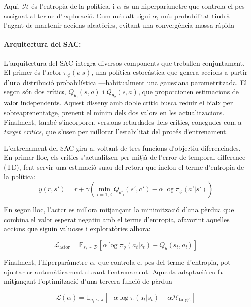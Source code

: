 \documentclass[12pt,a4paper,twoside]{book}
\begin{document}
Aquí, $\mathcal{H}$ és l'entropia de la política, i $\alpha$ és un hiperparàmetre que controla el pes assignat al terme d'exploració. Com més alt sigui $\alpha$, més probabilitat tindrà l'agent de mantenir accions aleatòries, evitant una convergència massa ràpida.

\paragraph{Arquitectura del SAC:}

L'arquitectura del SAC integra diversos components que treballen conjuntament. El primer és l'actor $\pi_\phi(a|s)$, una política estocàstica que genera accions a partir d'una distribució probabilística —habitualment una gaussiana parametritzada. El segon són dos crítics, $Q_{\theta_1}(s,a)$ i $Q_{\theta_2}(s,a)$, que proporcionen estimacions de valor independents. Aquest disseny amb doble crític busca reduir el biaix per sobreaprenentatge, prenent el mínim dels dos valors en les actualitzacions. Finalment, també s'incorporen versions retardades dels crítics, conegudes com a \textit{target critics}, que s'usen per millorar l'estabilitat del procés d'entrenament.


L'entrenament del SAC gira al voltant de tres funcions d'objectiu diferenciades. En primer lloc, els crítics s'actualitzen per mitjà de l'error de temporal difference (TD), fent servir una estimació suau del retorn que inclou el terme d'entropia de la política:
  \begin{equation}
  y(r,s') = r + \gamma \left( \min_{i=1,2} Q_{\theta'_i}(s', a') - \alpha \log \pi_\phi(a'|s') \right)
  \end{equation}

  En segon lloc, l'actor es millora mitjançant la minimització d'una pèrdua que combina el valor esperat negatiu amb el terme d'entropia, afavorint aquelles accions que siguin valuoses i exploratòries alhora:

  \begin{equation}
  \mathcal{L}_{\text{actor}} = \mathbb{E}_{s_t \sim \mathcal{D}} \left[ \alpha \log \pi_\phi(a_t|s_t) - Q_{\theta}(s_t, a_t) \right]
  \end{equation}

  Finalment, l'hiperparàmetre $\alpha$, que controla el pes del terme d'entropia, pot ajustar-se automàticament durant l'entrenament. Aquesta adaptació es fa mitjançant l'optimització d'una tercera funció de pèrdua:

  \begin{equation}
  \mathcal{L}(\alpha) = \mathbb{E}_{a_t \sim \pi} \left[ -\alpha \log \pi(a_t|s_t) - \alpha \mathcal{H}_\text{target} \right]
  \end{equation}
\end{document}
